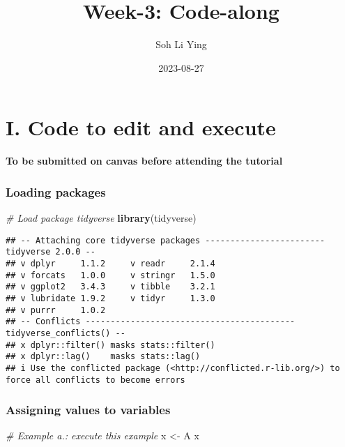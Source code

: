 \documentclass[
]{article}
\title{Week-3: Code-along}
\author{Soh Li Ying}
\date{2023-08-27}
\newenvironment{Shaded}{\begin{snugshade}}{\end{snugshade}}
\newcommand{\CommentTok}[1]{\textcolor[rgb]{0.56,0.35,0.01}{\textit{#1}}}
\newcommand{\FunctionTok}[1]{\textcolor[rgb]{0.13,0.29,0.53}{\textbf{#1}}}
\newcommand{\NormalTok}[1]{#1}
\newcommand{\OtherTok}[1]{\textcolor[rgb]{0.56,0.35,0.01}{#1}}
\newcommand{\StringTok}[1]{\textcolor[rgb]{0.31,0.60,0.02}{#1}}
\begin{document}
\maketitle

\hypertarget{i.-code-to-edit-and-execute}{%
\section{I. Code to edit and
execute}\label{i.-code-to-edit-and-execute}}

\textbf{To be submitted on canvas before attending the tutorial}

\hypertarget{loading-packages}{%
\subsubsection{Loading packages}\label{loading-packages}}

\begin{Shaded}
\begin{Highlighting}[]
\CommentTok{\# Load package tidyverse}
\FunctionTok{library}\NormalTok{(tidyverse)}
\end{Highlighting}
\end{Shaded}

\begin{verbatim}
## -- Attaching core tidyverse packages ------------------------ tidyverse 2.0.0 --
## v dplyr     1.1.2     v readr     2.1.4
## v forcats   1.0.0     v stringr   1.5.0
## v ggplot2   3.4.3     v tibble    3.2.1
## v lubridate 1.9.2     v tidyr     1.3.0
## v purrr     1.0.2     
## -- Conflicts ------------------------------------------ tidyverse_conflicts() --
## x dplyr::filter() masks stats::filter()
## x dplyr::lag()    masks stats::lag()
## i Use the conflicted package (<http://conflicted.r-lib.org/>) to force all conflicts to become errors
\end{verbatim}

\hypertarget{assigning-values-to-variables}{%
\subsubsection{Assigning values to
variables}\label{assigning-values-to-variables}}

\begin{Shaded}
\begin{Highlighting}[]
\CommentTok{\# Example a.: execute this example}
\NormalTok{x }\OtherTok{\textless{}{-}} \StringTok{\textquotesingle{}A\textquotesingle{}}
\NormalTok{x}
\end{Highlighting}
\end{Shaded}
\end{document}
